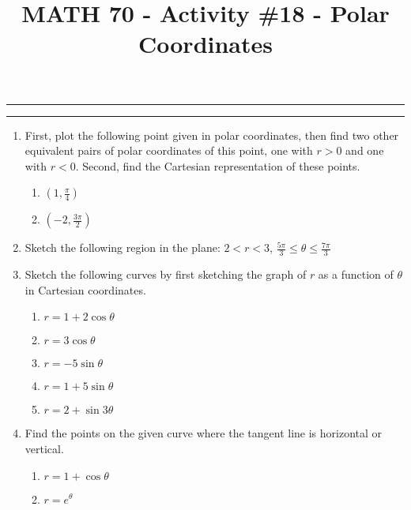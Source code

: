 \documentclass[12pt,oneside,english]{amsart}
\begin{document}
\title{MATH 70 - Activity \#18 - Polar Coordinates}

\maketitle
\thispagestyle{empty}

\hrule
\medskip
\hrule

\vspace{1cm}


\begin{enumerate}[leftmargin=*]
\setlength\itemsep{1.5cm}

\item First, plot the following point given in polar coordinates, then find two other equivalent pairs of polar coordinates of this point, one with $r>0$ and one with $r<0$. Second, find the Cartesian representation of these points.

\begin{enumerate}
\item $\left(1,\frac{\pi}{4}\right)$
\item $\left(-2,\frac{3\pi}{2}\right)$
\end{enumerate}


\item Sketch the following region in the plane: $2<r<3$, \hspace{0.25cm}$\frac{5\pi}{3}\leq\theta\leq\frac{7\pi}{3}$

\item Sketch the following curves by first sketching the graph of $r$ as a function of $\theta$ in Cartesian coordinates.

\begin{enumerate}
\item $r=1+2\cos\theta$
\item $r=3\cos\theta$
\item $r=-5\sin\theta$
\item $r=1+5\sin\theta$
\item $r=2+\sin3\theta$
\end{enumerate}

\item Find the points on the given curve where the tangent line is horizontal or vertical.

\begin{enumerate}
\item $r=1+\cos\theta$
\item $r=e^\theta$
\end{enumerate}
\end{enumerate}
\end{document}
